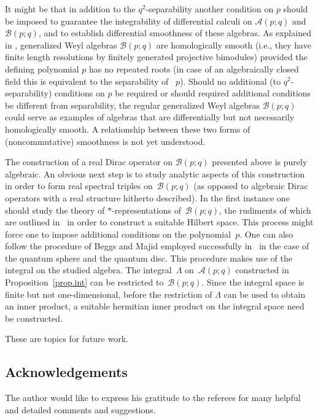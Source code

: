 \documentclass[10pt,a4paper]{amsart}
\numberwithin{equation}{section}
\def\Weyl#1#2{{\mathcal{B}}(#1;#2)}
\def\AWeyl#1#2{{\mathcal{A}}(#1;#2)}
\begin{document}
It might be that in addition to the $q^2$-separability another condition on $p$ should be imposed to guarantee the integrability of dif\/ferential calculi on $\AWeyl p q$ and $\Weyl p q$, and to establish dif\/ferential smoothness of these algebras. As explained in \cite{Liu:hom}, generalized Weyl algebras $\Weyl p q$ are homologically smooth (i.e., they have f\/inite length resolutions by f\/initely generated projective bimodules) provided the def\/ining polynomial $p$ has no repeated roots (in case of an algebraically closed f\/ield this is equivalent to the separability of ~$p$). Should no additional (to $q^2$-separability) conditions on $p$ be required or should required additional conditions be dif\/ferent from separability, the regular generalized Weyl algebras $\Weyl p q$ could serve as examples of algebras that are dif\/ferentially but not necessarily homologically smooth. A relationship between these two forms of (noncommutative) smoothness is not yet understood.

The construction of a real Dirac operator on $\Weyl p q$ presented above is purely algebraic. An obvious next step is to study analytic aspects of this construction in order to form real spectral triples on~$\Weyl p q$ (as opposed to algebraic Dirac operators with a real structure hitherto described). In the f\/irst instance one should study the theory of $*$-representations of~$\Weyl p q$, the rudiments of which are outlined in~\cite{Brz:gen} in order to construct a suitable Hilbert space. This process might force one to impose additional conditions on the polynomial~$p$. One can also follow the procedure of Beggs and Majid employed successfully in~\cite{BegMaj:spe} in the case of the quantum sphere and the quantum disc. This procedure makes use of the integral on the studied algebra. The integral~$\Lambda$ on~$\AWeyl p q$ constructed in Proposition~\ref{prop.int} can be restricted to~$\Weyl p q$. Since the integral space is f\/inite but not one-dimensional, before the restriction of $\Lambda$ can be used to obtain an inner product, a suitable hermitian inner product on the integral space need be constructed.

These are topics for future work.

\subsection*{Acknowledgements}
The author would like to express his gratitude to the referees for many helpful and detailed comments and suggestions.
\end{document}
